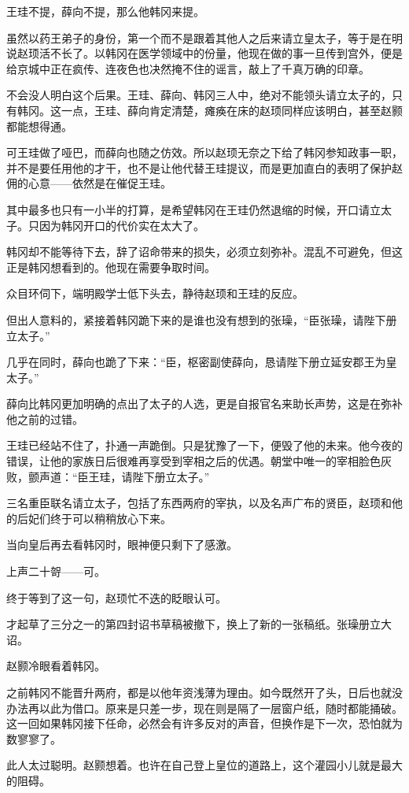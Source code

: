 王珪不提，薛向不提，那么他韩冈来提。

虽然以药王弟子的身份，第一个而不是跟着其他人之后来请立皇太子，等于是在明说赵顼活不长了。以韩冈在医学领域中的份量，他现在做的事一旦传到宫外，便是给京城中正在疯传、连夜色也决然掩不住的谣言，敲上了千真万确的印章。

不会没人明白这个后果。王珪、薛向、韩冈三人中，绝对不能领头请立太子的，只有韩冈。这一点，王珪、薛向肯定清楚，瘫痪在床的赵顼同样应该明白，甚至赵颢都能想得通。

可王珪做了哑巴，而薛向也随之仿效。所以赵顼无奈之下给了韩冈参知政事一职，并不是要任用他的才干，也不是让他代替王珪提议，而是更加直白的表明了保护赵佣的心意——依然是在催促王珪。

其中最多也只有一小半的打算，是希望韩冈在王珪仍然退缩的时候，开口请立太子。只因为韩冈开口的代价实在太大了。

韩冈却不能等待下去，辞了诏命带来的损失，必须立刻弥补。混乱不可避免，但这正是韩冈想看到的。他现在需要争取时间。

众目环伺下，端明殿学士低下头去，静待赵顼和王珪的反应。

但出人意料的，紧接着韩冈跪下来的是谁也没有想到的张璪，“臣张璪，请陛下册立太子。”

几乎在同时，薛向也跪了下来：“臣，枢密副使薛向，恳请陛下册立延安郡王为皇太子。”

薛向比韩冈更加明确的点出了太子的人选，更是自报官名来助长声势，这是在弥补他之前的过错。

王珪已经站不住了，扑通一声跪倒。只是犹豫了一下，便毁了他的未来。他今夜的错误，让他的家族日后很难再享受到宰相之后的优遇。朝堂中唯一的宰相脸色灰败，颤声道：“臣王珪，请陛下册立太子。”

三名重臣联名请立太子，包括了东西两府的宰执，以及名声广布的贤臣，赵顼和他的后妃们终于可以稍稍放心下来。

当向皇后再去看韩冈时，眼神便只剩下了感激。

上声二十哿——可。

终于等到了这一句，赵顼忙不迭的眨眼认可。

才起草了三分之一的第四封诏书草稿被撤下，换上了新的一张稿纸。张璪册立大诏。

赵颢冷眼看着韩冈。

之前韩冈不能晋升两府，都是以他年资浅薄为理由。如今既然开了头，日后也就没办法再以此为借口。原来是只差一步，现在则是隔了一层窗户纸，随时都能捅破。这一回如果韩冈接下任命，必然会有许多反对的声音，但换作是下一次，恐怕就为数寥寥了。

此人太过聪明。赵颢想着。也许在自己登上皇位的道路上，这个灌园小儿就是最大的阻碍。

